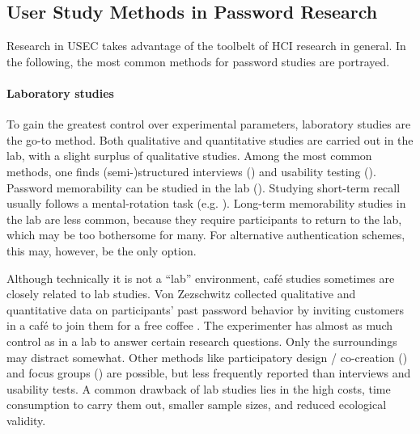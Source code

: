 %

%
%

\subsection{User Study Methods in Password Research}
Research in \acrshort{USEC} takes advantage of the toolbelt of \acrshort{HCI} research in general. In the following, the most common methods for password studies are portrayed.
\paragraph{Laboratory studies}
To gain the greatest control over experimental parameters, laboratory studies are the go-to method. Both qualitative and quantitative studies are carried out in the lab, with a slight surplus of qualitative studies. Among the most common methods, one finds (semi-)structured interviews (\cite{Adams1997MakingPWsSecureAndUsable,Gaw2006PasswordManagement, Stobert2014PasswordLifeCycle, Ur2015PWCreationLab, Weirich2001PrettyGoodPersuasion}) and usability testing (\cite{Egelman2013DoesMyPasswordGoUpToEleven,Forget2007HelpingUsers,Forget2015CYOA,Gross2016CognitiveDepletion,Imran2015PWsAdultsChildren, McCarney2012Tapas,Mcevoy2016ContextualizingMnemonicPhrase,Ruoti2015AuthenticationMelee, Yang2014EntryAffectsPasswordSecurity,VonZezschwitz2014HoneyIShrunkTheKeys}). Password memorability can be studied in the lab (\cite{Egelman2013DoesMyPasswordGoUpToEleven,Fahl2013EcologicalValidityPasswordStudy,Forget2008MemorabilityPersuasivePasswords,Mcevoy2016ContextualizingMnemonicPhrase,Yan2004PasswordMemorabilitySecurity}). Studying short-term recall usually follows a mental-rotation task (e.g. \cite{Kraus2017Emoji,Yang2014EntryAffectsPasswordSecurity}). Long-term memorability studies in the lab are less common, because they require participants to return to the lab, which may be too bothersome for many. For alternative authentication schemes, this may, however, be the only option. 

Although technically it is not a ``lab'' environment, café studies sometimes are closely related to lab studies. Von Zezschwitz \etal collected qualitative and quantitative data on participants' past password behavior by inviting customers in a café to join them for a free coffee \cite{VonZezschwitz2013SurvivalShortest}. The experimenter has almost as much control as in a lab to answer certain research questions. Only the surroundings may distract somewhat. Other methods like participatory design / co-creation (\cite{Coventry2014SCENEBehavioralNudges,Read2009UnderMyPillow}) and focus groups (\cite{Eargle2015YouCanDoBetter,Hang2015Dissertation,Harbach2016HardLockLife,Singh2007PasswordSharing}) are possible, but less frequently reported than interviews and usability tests. A common drawback of lab studies lies in the high costs, time consumption to carry them out, smaller sample sizes, and reduced ecological validity.


